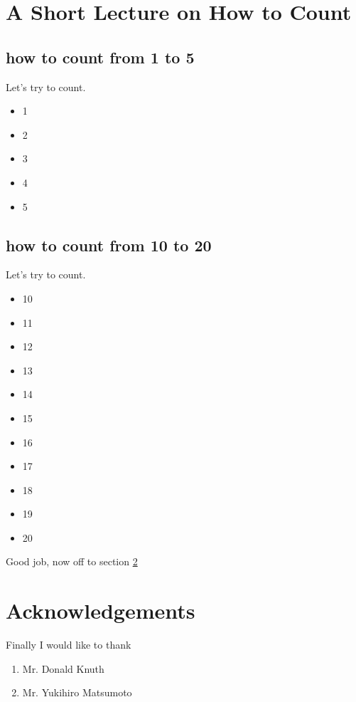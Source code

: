 \documentclass{article}
\begin{document}
\section{A Short Lecture on How to Count}
\subsection{how to count from 1 to 5}
Let's try to count.\begin{itemize}
\item{1}
\item{2}
\item{3}
\item{4}
\item{5}
\end{itemize}
\subsection{how to count from 10 to 20}
Let's try to count.\begin{itemize}
\item{10}
\item{11}
\item{12}
\item{13}
\item{14}
\item{15}
\item{16}
\item{17}
\item{18}
\item{19}
\item{20}
\end{itemize}
Good job, now off to section \ref{acks}
\section{Acknowledgements}
\label{acks}
Finally I would like to thank 
\begin{enumerate}
\item{Mr. Donald Knuth}
\item{Mr. Yukihiro Matsumoto}
\end{enumerate}
\end{document}
